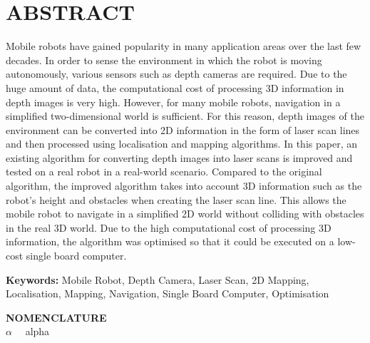 \section*{ABSTRACT}
\vspace{0.5cm}
Mobile robots have gained popularity in many application areas over the last few decades. In order to sense the environment in which the robot is moving autonomously, various sensors such as depth cameras are required. Due to the huge amount of data, the computational cost of processing 3D information in depth images is very high. However, for many mobile robots, navigation in a simplified two-dimensional world is sufficient. For this reason, depth images of the environment can be converted into 2D information in the form of laser scan lines and then processed using localisation and mapping algorithms.
In this paper, an existing algorithm for converting depth images into laser scans is improved and tested on a real robot in a real-world scenario. Compared to the original algorithm, the improved algorithm takes into account 3D information such as the robot's height and obstacles when creating the laser scan line. This allows the mobile robot to navigate in a simplified 2D world without colliding with obstacles in the real 3D world. Due to the high computational cost of processing 3D information, the algorithm was optimised so that it could be executed on a low-cost single board computer.

\vspace{0.5cm}
\textbf{Keywords:} Mobile Robot, Depth Camera, Laser Scan, 2D Mapping, Localisation, Mapping, Navigation, Single Board Computer, Optimisation

\vspace{0.5cm}
\textbf{NOMENCLATURE}
\\
$\alpha \quad$ alpha
